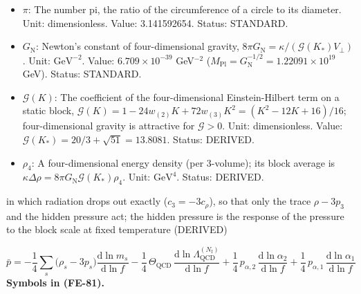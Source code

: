 \documentclass[
  10pt,
]{article}
\begin{document}
\begin{itemize}
  \(\mathrm{d}\): The differential: \(\mathrm{d}X\) is an infinitesimal
  change of \(X\), \(\mathrm{d}X/\mathrm{d}Y\) the derivative of \(X\)
  with respect to \(Y\), \(\mathrm{d}^nX\) the volume element of \(n\)
  variables. Status: STANDARD.
\item
  \(\pi\): The number pi, the ratio of the circumference of a circle to
  its diameter. Unit: dimensionless. Value: 3.141592654. Status:
  STANDARD.
\item
  \(G_{\mathrm{N}}\): Newton's constant of four-dimensional gravity,
  \(8\pi G_{\mathrm{N}} = \kappa/(\mathcal{G}(K_*)V_\perp)\). Unit:
  \(\mathrm{GeV}^{-2}\). Value: \(6.709\times10^{-39}\) GeV\(^{-2}\)
  (\(M_{\mathrm{Pl}} = G_{\mathrm{N}}^{-1/2} = 1.22091\times10^{19}\)
  GeV). Status: STANDARD.
\item
  \(\mathcal{G}(K)\): The coefficient of the four-dimensional
  Einstein-Hilbert term on a static block,
  \(\mathcal{G}(K) = 1 - 24w_{(2)}K + 72w_{(3)}K^2 = (K^2 - 12K + 16)/16\);
  four-dimensional gravity is attractive for \(\mathcal{G} > 0\). Unit:
  dimensionless. Value:
  \(\mathcal{G}(K_*) = 20/3 + \sqrt{51} = 13.8081\). Status: DERIVED.
\item
  \(\rho_4\): A four-dimensional energy density (per 3-volume); its
  block average is
  \(\kappa\Delta\rho = 8\pi G_{\mathrm{N}}\mathcal{G}(K_*)\rho_4\).
  Unit: \(\mathrm{GeV}^{4}\). Status: DERIVED.
\end{itemize}

in which radiation drops out exactly (\(c_3 = -3c_\rho\)), so that only
the trace \(\rho - 3p_3\) and the hidden pressure act; the hidden
pressure is the response of the pressure to the block scale at fixed
temperature (DERIVED)

\[
\bar p = -\frac14\sum_s\big(\rho_s - 3p_s\big)\frac{\mathrm{d}\ln m_s}{\mathrm{d}\ln f}
 - \frac14\,\Theta_{\mathrm{QCD}}\,\frac{\mathrm{d}\ln\Lambda_{\mathrm{QCD}}^{(N_{\mathrm{f}})}}{
 \mathrm{d}\ln f}
 + \frac14\,p_{\alpha,2}\,\frac{\mathrm{d}\ln\alpha_2}{\mathrm{d}\ln f} +
 \frac14\,p_{\alpha,1}\,\frac{\mathrm{d}\ln\alpha_1}{\mathrm{d}\ln f} \tag{FE-81}
\] \textbf{Symbols in (FE-81).}
\end{document}
